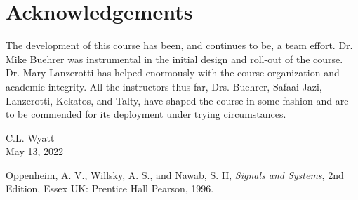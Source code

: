 \documentclass[]{book}
\theoremstyle{definition}
\numberwithin{section}{chapter}
\numberwithin{equation}{chapter}
\begin{document}
\section*{Acknowledgements}
The development of this course has been, and continues to be, a team effort. Dr. Mike Buehrer was instrumental in the initial design and roll-out of the course. Dr. Mary Lanzerotti has helped enormously with the course organization and academic integrity. All the instructors thus far, Drs. Buehrer, Safaai-Jazi, Lanzerotti, Kekatos, and Talty, have shaped the course in some fashion and are to be commended for its deployment under trying circumstances.

\vspace{2em}
\begin{flushright}
C.L. Wyatt\\
May 13, 2022
\end{flushright}


\tableofcontents
\mainmatter
























\appendix


\backmatter

\begin{thebibliography}{9}

  Oppenheim, A. V., Willsky, A. S., and Nawab, S. H, \textit{Signals and Systems}, 2nd Edition, Essex UK: Prentice Hall Pearson, 1996.

\end{thebibliography}

\printindex
\end{document}
